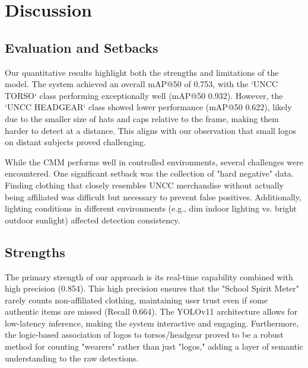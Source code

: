 \section{Discussion}
\label{sec:discussion}

\subsection{Evaluation and Setbacks}
Our quantitative results highlight both the strengths and limitations of the model. The system achieved an overall mAP@50 of 0.753, with the `UNCC TORSO` class performing exceptionally well (mAP@50 0.932). However, the `UNCC HEADGEAR` class showed lower performance (mAP@50 0.622), likely due to the smaller size of hats and caps relative to the frame, making them harder to detect at a distance. This aligns with our observation that small logos on distant subjects proved challenging.

While the CMM performs well in controlled environments, several challenges were encountered. One significant setback was the collection of "hard negative" data. Finding clothing that closely resembles UNCC merchandise without actually being affiliated was difficult but necessary to prevent false positives. Additionally, lighting conditions in different environments (e.g., dim indoor lighting vs. bright outdoor sunlight) affected detection consistency.

\subsection{Strengths}
The primary strength of our approach is its real-time capability combined with high precision (0.854). This high precision ensures that the "School Spirit Meter" rarely counts non-affiliated clothing, maintaining user trust even if some authentic items are missed (Recall 0.664). The YOLOv11 architecture allows for low-latency inference, making the system interactive and engaging. Furthermore, the logic-based association of logos to torsos/headgear proved to be a robust method for counting "wearers" rather than just "logos," adding a layer of semantic understanding to the raw detections.
